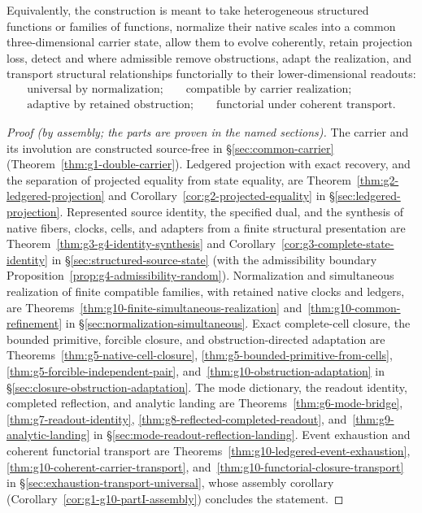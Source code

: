 \documentclass[11pt]{article}
\theoremstyle{definition}
\begin{document}
Equivalently, the construction is meant to take heterogeneous structured
functions or families of functions, normalize their native scales into a
common three-dimensional carrier state, allow them to evolve coherently,
retain projection loss, detect and where admissible remove obstructions, adapt
the realization, and transport structural relationships functorially to their
lower-dimensional readouts:
\[
\boxed{
\begin{gathered}
\text{universal by normalization;} \qquad
\text{compatible by carrier realization;}\\
\text{adaptive by retained obstruction;} \qquad
\text{functorial under coherent transport.}
\end{gathered}
}
\]

\begin{proof}[Proof (by assembly; the parts are proven in the named sections)]
The carrier and its involution are constructed source-free in
\S\ref{sec:common-carrier} (Theorem~\ref{thm:g1-double-carrier}).  Ledgered
projection with exact recovery, and the separation of projected equality from
state equality, are Theorem~\ref{thm:g2-ledgered-projection} and
Corollary~\ref{cor:g2-projected-equality} in \S\ref{sec:ledgered-projection}.
Represented source identity, the specified dual, and the synthesis of native
fibers, clocks, cells, and adapters from a finite structural presentation are
Theorem~\ref{thm:g3-g4-identity-synthesis} and
Corollary~\ref{cor:g3-complete-state-identity} in
\S\ref{sec:structured-source-state} (with the admissibility boundary
Proposition~\ref{prop:g4-admissibility-random}).  Normalization and
simultaneous realization of finite compatible families, with retained native
clocks and ledgers, are Theorems~\ref{thm:g10-finite-simultaneous-realization}
and~\ref{thm:g10-common-refinement} in \S\ref{sec:normalization-simultaneous}.
Exact complete-cell closure, the bounded primitive, forcible closure, and
obstruction-directed adaptation are
Theorems~\ref{thm:g5-native-cell-closure},
\ref{thm:g5-bounded-primitive-from-cells},
\ref{thm:g5-forcible-independent-pair},
and~\ref{thm:g10-obstruction-adaptation} in
\S\ref{sec:closure-obstruction-adaptation}.  The mode dictionary, the readout
identity, completed reflection, and analytic landing are
Theorems~\ref{thm:g6-mode-bridge}, \ref{thm:g7-readout-identity},
\ref{thm:g8-reflected-completed-readout}, and~\ref{thm:g9-analytic-landing} in
\S\ref{sec:mode-readout-reflection-landing}.  Event exhaustion and coherent
functorial transport are Theorems~\ref{thm:g10-ledgered-event-exhaustion},
\ref{thm:g10-coherent-carrier-transport},
and~\ref{thm:g10-functorial-closure-transport} in
\S\ref{sec:exhaustion-transport-universal}, whose assembly corollary
(Corollary~\ref{cor:g1-g10-partI-assembly}) concludes the statement.
\end{proof}
\end{document}
